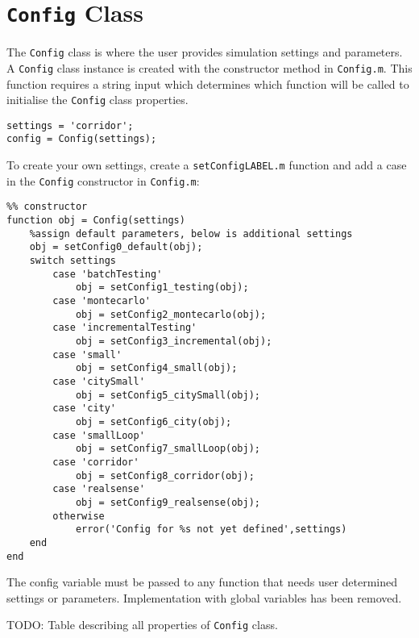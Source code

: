 \section{\texttt{Config} Class}
The \texttt{Config} class is where the user provides simulation settings and parameters.
A \texttt{Config} class instance is created with the constructor method in \texttt{Config.m}. This function requires a string input which determines which function will be called to initialise the \texttt{Config} class properties.
\begin{lstlisting}
settings = 'corridor';
config = Config(settings);
\end{lstlisting}

To create your own settings, create a \texttt{setConfigLABEL.m} function and add a case in the \texttt{Config} constructor in \texttt{Config.m}:
\begin{lstlisting}
%% constructor
function obj = Config(settings)
	%assign default parameters, below is additional settings
	obj = setConfig0_default(obj);
    switch settings                    
    	case 'batchTesting'
    		obj = setConfig1_testing(obj);
    	case 'montecarlo'
        	obj = setConfig2_montecarlo(obj);
    	case 'incrementalTesting'
        	obj = setConfig3_incremental(obj);
    	case 'small'
        	obj = setConfig4_small(obj);
    	case 'citySmall'
        	obj = setConfig5_citySmall(obj);
    	case 'city'
        	obj = setConfig6_city(obj);
    	case 'smallLoop'
        	obj = setConfig7_smallLoop(obj);
    	case 'corridor'
        	obj = setConfig8_corridor(obj);
    	case 'realsense'
        	obj = setConfig9_realsense(obj);
    	otherwise
        	error('Config for %s not yet defined',settings)
    end
end
\end{lstlisting}

The config variable must be passed to any function that needs user determined settings or parameters. Implementation with global variables has been removed.

TODO: Table describing all properties of \texttt{Config} class.

